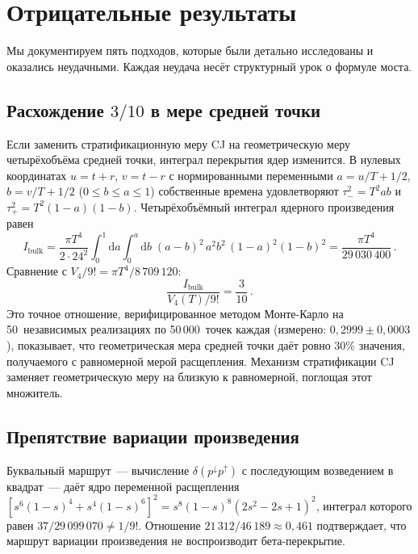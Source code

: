 \documentclass[12pt,a4paper]{article}
\theoremstyle{plain}
\theoremstyle{definition}
\theoremstyle{remark}
\newcommand{\dd}{\mathrm{d}}
\begin{document}
\section{Отрицательные результаты}
\label{sec:nogo}

Мы документируем пять подходов, которые были детально
исследованы и оказались неудачными.  Каждая неудача несёт
структурный урок о формуле моста.

\subsection{Расхождение $3/10$ в мере средней точки}
\label{sec:midpoint}

Если заменить стратификационную меру CJ на геометрическую
меру четырёхобъёма средней точки, интеграл перекрытия ядер
изменится.  В нулевых координатах $u = t+r$, $v = t-r$ с
нормированными переменными
$a = u/T + 1/2$, $b = v/T + 1/2$ ($0 \leq b \leq a \leq 1$)
собственные времена удовлетворяют $\tau_-^2 = T^2 ab$ и
$\tau_+^2 = T^2(1-a)(1-b)$.  Четырёхобъёмный интеграл
ядерного произведения равен
\begin{equation}\label{eq:Ibulk}
  I_{\mathrm{bulk}}
  = \frac{\pi T^4}{2 \cdot 24^2}
    \int_0^1 \dd a \int_0^a \dd b\;
    (a-b)^2\, a^2 b^2\, (1-a)^2 (1-b)^2
  = \frac{\pi T^4}{29\,030\,400}\,.
\end{equation}
Сравнение с $V_4/9! = \pi T^4/8\,709\,120$:
\begin{equation}\label{eq:three-tenths}
  \frac{I_{\mathrm{bulk}}}{V_4(T)/9!} = \frac{3}{10}\,.
\end{equation}
Это точное отношение, верифицированное методом Монте-Карло
на 50~независимых реализациях по 50\,000~точек каждая
(измерено: $0{,}2999 \pm 0{,}0003$), показывает, что
геометрическая мера средней точки даёт ровно $30\%$ значения,
получаемого с равномерной мерой расщепления.  Механизм
стратификации CJ заменяет геометрическую меру на близкую к
равномерной, поглощая этот множитель.

\subsection{Препятствие вариации произведения}
\label{sec:product-nogo}

Буквальный маршрут~--- вычисление
$\delta(p^{\downarrow} p^{\uparrow})$ с последующим
возведением в квадрат~--- даёт ядро переменной расщепления
$[s^6(1-s)^4 + s^4(1-s)^6]^2 = s^8(1-s)^8(2s^2 - 2s + 1)^2$,
интеграл которого равен $37/29\,099\,070 \neq 1/9!$.
Отношение $21\,312/46\,189 \approx 0{,}461$ подтверждает,
что маршрут вариации произведения не воспроизводит
бета-перекрытие.
\end{document}
